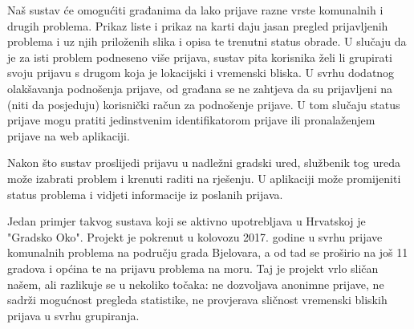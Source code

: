 		Naš sustav će omogućiti građanima da lako prijave razne vrste komunalnih i drugih problema. Prikaz liste i prikaz na karti daju jasan pregled prijavljenih problema i uz njih priloženih slika i opisa te trenutni status obrade. U slučaju da je za isti problem podneseno više prijava, sustav pita korisnika želi li grupirati svoju prijavu s drugom koja je lokacijski i vremenski bliska. U svrhu dodatnog olakšavanja podnošenja prijave, od građana se ne zahtjeva da su prijavljeni na (niti da posjeduju) korisnički račun za podnošenje prijave. U tom slučaju status prijave mogu pratiti jedinstvenim identifikatorom prijave ili pronalaženjem prijave na web aplikaciji.
		
		Nakon što sustav proslijedi prijavu u nadležni gradski ured, službenik tog ureda može izabrati problem i krenuti raditi na rješenju. U aplikaciji može promijeniti status problema i vidjeti informacije iz poslanih prijava.
		
		Jedan primjer takvog sustava koji se aktivno upotrebljava u Hrvatskoj je "Gradsko Oko". Projekt je pokrenut u kolovozu 2017. godine u svrhu prijave komunalnih problema na području grada Bjelovara, a od tad se proširio na još 11 gradova i općina te na prijavu problema na moru. Taj je projekt vrlo sličan našem, ali razlikuje se u nekoliko točaka: ne dozvoljava anonimne prijave, ne sadrži mogućnost pregleda statistike, ne provjerava sličnost vremenski bliskih prijava u svrhu grupiranja.
		
		
		
	